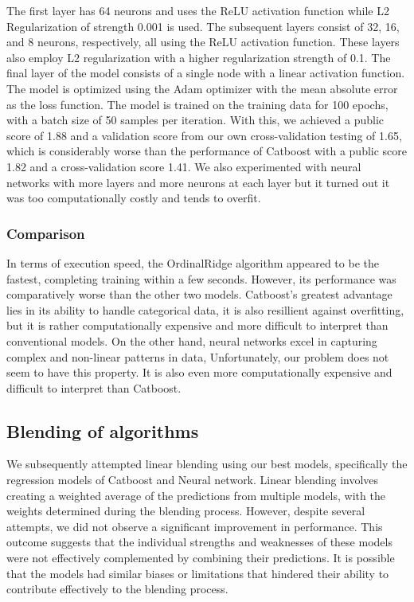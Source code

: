 \documentclass{article}
\begin{document}
The first layer has 64 neurons and uses the ReLU activation function while L2 Regularization of strength 0.001 is used. The subsequent layers consist of 32, 16, and 8 neurons, respectively, all using the ReLU activation function. These layers also employ L2 regularization with a higher regularization strength of 0.1.  The final layer of the model consists of a single node with a linear activation function. The model is optimized using the Adam optimizer with the mean absolute error as the loss function.
The model is trained on the training data for 100 epochs, with a batch size of 50 samples per iteration. With this, we achieved a public score of  1.88 and a validation score from our own cross-validation testing of  1.65, which is considerably worse than the performance of Catboost with a public score 1.82 and a cross-validation score 1.41. We also experimented with neural networks with more layers and more neurons at each layer but it turned out it was too computationally costly and tends to overfit.
\subsubsection{Comparison}
In terms of execution speed, the OrdinalRidge algorithm appeared to be the fastest, completing training within a few seconds. However, its performance was comparatively worse than the other two models. Catboost's greatest advantage lies in its ability to handle categorical data, it is also resillient against overfitting, but it is rather computationally expensive and more difficult to interpret than conventional models. On the other hand, neural networks excel in capturing complex and non-linear patterns in data, Unfortunately, our problem does not seem to have this property. It is also even more computationally expensive and difficult to interpret than Catboost.
\subsection{Blending of algorithms}
We subsequently attempted linear blending using our best models, specifically the regression models of Catboost and Neural network. Linear blending involves creating a weighted average of the predictions from multiple models, with the weights determined during the blending process. However, despite several attempts, we did not observe a significant improvement in performance. This outcome suggests that the individual strengths and weaknesses of these models were not effectively complemented by combining their predictions. It is possible that the models had similar biases or limitations that hindered their ability to contribute effectively to the blending process.
\end{document}
